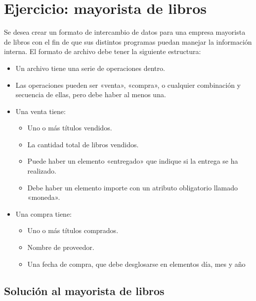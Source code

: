 \documentclass[letterpaper,10pt,spanish]{sphinxmanual}
\begin{document}
\section{Ejercicio: mayorista de libros}
\label{\detokenize{tema5:ejercicio-mayorista-de-libros}}
Se desea crear un formato de intercambio de datos para una empresa mayorista de libros con el fin de que sus distintos programas puedan manejar la información interna. El formato de archivo debe tener la siguiente estructura:
\begin{itemize}
\item {} 
Un archivo tiene una serie de operaciones dentro.

\item {} 
Las operaciones pueden ser «venta», «compra», o cualquier combinación y secuencia de ellas, pero debe haber al menos una.

\item {} 
Una venta tiene:
\begin{itemize}
\item {} 
Uno o más títulos vendidos.

\item {} 
La cantidad total de libros vendidos.

\item {} 
Puede haber un elemento «entregado» que indique si la entrega se ha realizado.

\item {} 
Debe haber un elemento importe con un atributo obligatorio llamado «moneda».

\end{itemize}

\item {} 
Una compra tiene:
\begin{itemize}
\item {} 
Uno o más títulos comprados.

\item {} 
Nombre de proveedor.

\item {} 
Una fecha de compra, que debe desglosarse en elementos día, mes y año

\end{itemize}

\end{itemize}


\subsection{Solución al mayorista de libros}
\label{\detokenize{tema5:solucion-al-mayorista-de-libros}}
\end{document}
